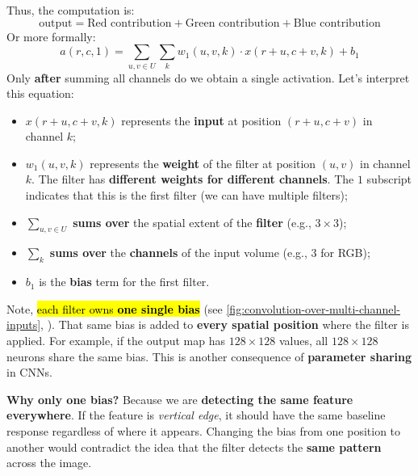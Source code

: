 Thus, the computation is:
\begin{equation*}
    \text{output} = \text{Red contribution} + \text{Green contribution} + \text{Blue contribution}
\end{equation*}
Or more formally:
\begin{equation}\label{eq:convolution-layer-single-filter}
    a\left(r,c,1\right) = \sum_{u,v \in U} \sum_{k} w_1(u,v,k) \cdot x(r+u, c+v, k) + b_1
\end{equation}
Only \textbf{after} summing all channels do we obtain a single activation. Let's interpret this equation:
\begin{itemize}
    \item $x(r+u, c+v, k)$ represents the \textbf{input} at position $(r+u, c+v)$ in channel $k$;
    \item $w_1(u,v,k)$ represents the \textbf{weight} of the filter at position $(u,v)$ in channel $k$. The filter has \textbf{different weights for different channels}. The $1$ subscript indicates that this is the first filter (we can have multiple filters);
    \item $\displaystyle \sum_{u,v \in U}$ \textbf{sums over} the spatial extent of the \textbf{filter} (e.g., $3 \times 3$);
    \item $\displaystyle \sum_{k}$ \textbf{sums over} the \textbf{channels} of the input volume (e.g., $3$ for RGB);
    \item $b_1$ is the \textbf{bias} term for the first filter.
\end{itemize}
Note, \hl{each filter owns \textbf{one single bias}} (see \autoref{fig:convolution-over-multi-channel-inputs}, ). That same bias is added to \textbf{every spatial position} where the filter is applied. For example, if the output map has $128 \times 128$ values, all $128 \times 128$ neurons share the same bias. This is another consequence of \textbf{parameter sharing} in CNNs.

\highspace
\textcolor{Green3}{ \textbf{Why only one bias?}} Because we are \textbf{detecting the same feature everywhere}. If the feature is \emph{vertical edge}, it should have the same baseline response regardless of where it appears. Changing the bias from one position to another would contradict the idea that the filter detects the \textbf{same pattern} across the image.

\newpage

